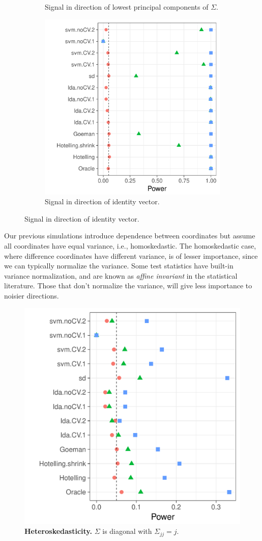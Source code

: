 \documentclass[12pt,a4paper]{article}
\begin{document}
\begin{figure}[h]
\begin{subfigure}[t]{.3\textwidth}
		\caption{Signal in direction of lowest principal components of $\Sigma$.} 
		\label{fig:dependence_32}
	\end{subfigure}
	\begin{subfigure}[t]{.3\textwidth}
		\centering
		\includegraphics[width=1\linewidth]{"art/file19"}
		\caption{Signal in direction of identity vector.} 
		\label{fig:dependence_33}
	\end{subfigure}
\end{figure}


Our previous simulations introduce dependence between coordinates but assume all coordinates have equal variance, i.e., homoskedastic. 
The homoskedastic case, where difference coordinates have different variance, is of lesser importance, since we can typically normalize the variance. 
Some test statistics have built-in variance normalization, and are known as \emph{affine invariant} in the statistical literature. 
Those that don't normalize the variance, will give less importance to noisier directions. 

\begin{figure}[h]
	\centering
	\includegraphics[width=0.5\linewidth]{"art/file24"}
	\caption{
		\textbf{Heteroskedasticity.} 
		$\Sigma$ is diagonal with $\Sigma_{jj}=j$.
		}  
	\label{fig:heteroskedastic}
\end{figure}
\end{document}
